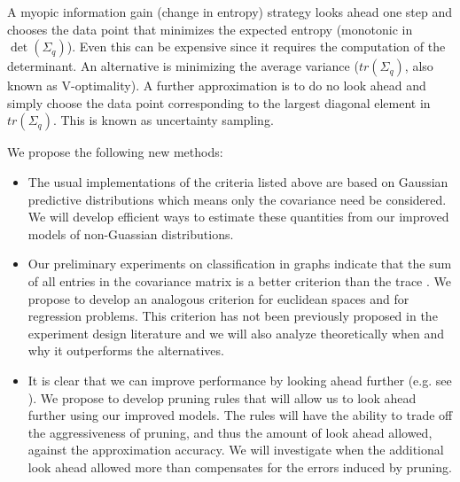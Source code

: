 \documentclass[useAMS,usenatbib,tightenlines,11pt,preprint]{aastex}
\begin{document}
A myopic information gain (change in entropy) strategy looks ahead one step
and chooses the data point that minimizes the expected entropy (monotonic
in $\det(\Sigma_q)$).  Even this can be expensive since it requires the
computation of the determinant.  An alternative is minimizing the average
variance ($tr(\Sigma_q)$, also known as V-optimality).  A further
approximation is to do no look ahead and simply choose the data point
corresponding to the largest diagonal element in $tr(\Sigma_q)$.  This is
known as uncertainty sampling.

We propose the following new methods:

\begin{itemize}

\item The usual implementations of the criteria listed above are based on
  Gaussian predictive distributions which means only the covariance need be
  considered.  We will develop efficient ways to estimate these quantities
  from our improved models of non-Guassian distributions.

\item Our preliminary experiments on classification in graphs indicate that
  the sum of all entries in the covariance matrix is a better criterion
  than the trace \cite{YifeiMa12}.  We propose to develop an analogous
  criterion for euclidean spaces and for regression problems.  This
  criterion has not been previously proposed in the experiment design
  literature and we will also analyze theoretically when and why it
  outperforms the alternatives.

\item It is clear that we can improve performance by looking ahead further
  (e.g. see \cite{Garnett12}).  We propose to develop pruning rules that
  will allow us to look ahead further using our improved models.  The rules
  will have the ability to trade off the aggressiveness of pruning, and
  thus the amount of look ahead allowed, against the approximation
  accuracy.  We will investigate when the additional look ahead allowed
  more than compensates for the errors induced by pruning.

\end{itemize}
\end{document}
